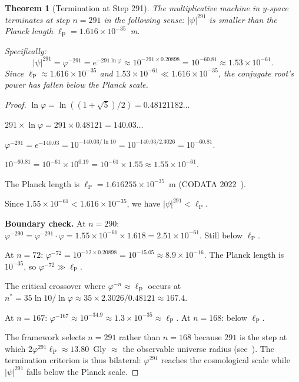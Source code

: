 \documentclass[11pt,a4paper]{article}
\theoremstyle{plain}
\newtheorem{theorem}{Theorem}[section]
\theoremstyle{definition}
\newcommand{\vp}{\varphi}
\newcommand{\ps}{\psi}
\begin{document}
\begin{theorem}[Termination at Step 291]\label{thm:termination}
The multiplicative machine in $y$-space terminates at step $n = 291$
in the following sense: $|\ps|^{291}$ is smaller than the Planck
length $\ell_{\mathrm{P}} = 1.616 \times 10^{-35}$~m.

Specifically:
\begin{equation}\label{eq:termination}
  |\ps|^{291} = \vp^{-291} = e^{-291 \ln\vp}
  \approx 10^{-291 \times 0.20898} = 10^{-60.81} \approx 1.53 \times 10^{-61}.
\end{equation}
Since $\ell_{\mathrm{P}} \approx 1.616 \times 10^{-35}$ and
$1.53 \times 10^{-61} \ll 1.616 \times 10^{-35}$, the
conjugate root's power has fallen below the Planck scale.
\end{theorem}

\begin{proof}
$\ln\vp = \ln((1+\sqrt{5})/2) = 0.48121182\ldots$

$291 \times \ln\vp = 291 \times 0.48121 = 140.03\ldots$

$\vp^{-291} = e^{-140.03} = 10^{-140.03/\ln 10}
= 10^{-140.03/2.3026} = 10^{-60.81}$.

$10^{-60.81} = 10^{-61} \times 10^{0.19} = 10^{-61} \times 1.55
\approx 1.55 \times 10^{-61}$.

The Planck length is $\ell_{\mathrm{P}} = 1.616255 \times 10^{-35}$~m
(CODATA 2022~\cite{codata2022}).

Since $1.55 \times 10^{-61} < 1.616 \times 10^{-35}$, we have
$|\ps|^{291} < \ell_{\mathrm{P}}$.

\medskip
\noindent\textbf{Boundary check.}
At $n = 290$: $\vp^{-290} = \vp^{-291} \cdot \vp = 1.55 \times 10^{-61}
\times 1.618 = 2.51 \times 10^{-61}$.  Still below $\ell_{\mathrm{P}}$.

At $n = 72$: $\vp^{-72} = 10^{-72 \times 0.20898} = 10^{-15.05}
\approx 8.9 \times 10^{-16}$.  The Planck length is $10^{-35}$, so
$\vp^{-72} \gg \ell_{\mathrm{P}}$.

The critical crossover where $\vp^{-n} \approx \ell_{\mathrm{P}}$ occurs at
$n^{*} = 35\ln 10 / \ln\vp \approx 35 \times 2.3026 / 0.48121 \approx 167.4$.

At $n = 167$: $\vp^{-167} \approx 10^{-34.9} \approx 1.3 \times 10^{-35}
\approx \ell_{\mathrm{P}}$.  At $n = 168$: below $\ell_{\mathrm{P}}$.

The framework selects $n = 291$ rather than $n = 168$ because $291$
is the step at which $2\vp^{291} \ell_{\mathrm{P}} \approx 13.80$~Gly
$\approx$ the observable universe radius (see~\cite{axiom-theory}).
The termination criterion is thus bilateral: $\vp^{291}$ reaches the
cosmological scale while $|\ps|^{291}$ falls below the Planck scale.
\end{proof}
\end{document}
